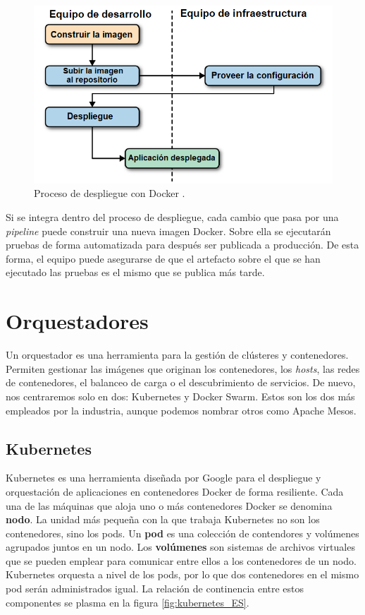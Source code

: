 \documentclass[11pt,spanish,listoffigures]{tfgetsinf}
\begin{document}
\begin{figure}[h]
\centering
\includegraphics[scale=0.7]{docker_process_ES}
\caption{Proceso de despliegue con Docker \cite{Matthias}.}
\label{fig:docker_process_ES}
\end{figure}

Si se integra dentro del proceso de despliegue, cada cambio que pasa por una \textit{pipeline} puede construir una nueva imagen Docker. Sobre ella se ejecutarán pruebas de forma automatizada para después ser publicada a producción. De esta forma, el equipo puede asegurarse de que el artefacto sobre el que se han ejecutado las pruebas es el mismo que se publica más tarde. 

\section{Orquestadores}

Un orquestador \cite{DelaTorre2018} es una herramienta para la gestión de clústeres y contenedores. Permiten gestionar las imágenes que originan los contenedores, los \textit{hosts}, las redes de contenedores, el balanceo de carga o el descubrimiento de servicios. De nuevo, nos centraremos solo en dos: Kubernetes y Docker Swarm. Estos son los dos más empleados por la industria, aunque podemos nombrar otros como  Apache Mesos.

\subsection{Kubernetes} \label{subsect:Kubernetes}
Kubernetes \cite{Rensin2015} es una herramienta diseñada por Google para el despliegue y orquestación de aplicaciones en contenedores Docker de forma resiliente. Cada una de las máquinas que aloja uno o más contenedores Docker se denomina \textbf{nodo}. La unidad más pequeña con la que trabaja Kubernetes no son los contenedores, sino los pods. Un \textbf{pod} es una colección de contendores y volúmenes agrupados juntos en un nodo. Los \textbf{volúmenes} son sistemas de archivos virtuales que se pueden emplear para comunicar entre ellos a los contenedores de un nodo. Kubernetes orquesta a nivel de los pods, por lo que dos contenedores en el mismo pod serán administrados igual. La relación de continencia entre estos componentes se plasma en la figura \ref{fig:kubernetes_ES}.
\end{document}
